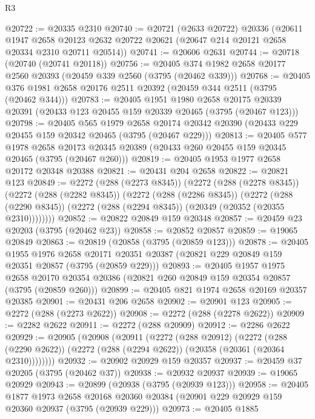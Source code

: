 \begin{lexlean}{R3}
\begin{coremodule}
@20722 := @20335 @2310
@20740 := @20721
    (@2633 @20722)
    @20336
    (@20611
      @1947
      @2658
      @20123
      @2632
      @20722
      @20621
      (@20647 @214 @20121 @2658 @20334 @2310 @20711 @20514))
@20741 := @20606 @2631
@20744 := @20718 (@20740 (@20741 @20118))
@20756 := @20405 @374 @1982 @2658 @20177 @2560 @20393 (@20459 @339 @2560 (@3795 (@20462 @339)))
@20768 := @20405 @376 @1981 @2658 @20176 @2511 @20392 (@20459 @344 @2511 (@3795 (@20462 @344)))
@20783 := @20405
    @1951
    @1980
    @2658
    @20175
    @20339
    @20391
    (@20433 @123 @20455 @159 @20339 @20465 (@3795 (@20467 @123)))
@20798 := @20405
    @565
    @1979
    @2658
    @20174
    @20342
    @20390
    (@20433 @229 @20455 @159 @20342 @20465 (@3795 (@20467 @229)))
@20813 := @20405
    @577
    @1978
    @2658
    @20173
    @20345
    @20389
    (@20433 @260 @20455 @159 @20345 @20465 (@3795 (@20467 @260)))
@20819 := @20405 @1953 @1977 @2658 @20172 @20348 @20388
@20821 := @20431 @204 @2658
@20822 := @20821 @123
@20849 := @2272
    (@288 (@2273 @8345))
    (@2272
      (@288 (@2278 @8345))
      (@2272
        (@288 (@2282 @8345))
        (@2272
          (@288 (@2286 @8345))
          (@2272
            (@288 (@2290 @8345))
            (@2272 (@288 (@2294 @8345)) (@20349 (@20352 (@20355 @2310))))))))
@20852 := @20822 @20849 @159 @20348
@20857 := @20459 @23 @20203 (@3795 (@20462 @23))
@20858 := @20852 @20857
@20859 := @19065 @20849
@20863 := @20819 (@20858 (@3795 (@20859 @123)))
@20878 := @20405
    @1955
    @1976
    @2658
    @20171
    @20351
    @20387
    (@20821 @229 @20849 @159 @20351 @20857 (@3795 (@20859 @229)))
@20893 := @20405
    @1957
    @1975
    @2658
    @20170
    @20354
    @20386
    (@20821 @260 @20849 @159 @20354 @20857 (@3795 (@20859 @260)))
@20899 := @20405 @821 @1974 @2658 @20169 @20357 @20385
@20901 := @20431 @206 @2658
@20902 := @20901 @123
@20905 := @2272 (@288 (@2273 @2622))
@20908 := @2272 (@288 (@2278 @2622))
@20909 := @2282 @2622
@20911 := @2272 (@288 @20909)
@20912 := @2286 @2622
@20929 := @20905
    (@20908
      (@20911
        (@2272
          (@288 @20912)
          (@2272
            (@288 (@2290 @2622))
            (@2272 (@288 (@2294 @2622)) (@20358 (@20361 (@20364 @2310))))))))
@20932 := @20902 @20929 @159 @20357
@20937 := @20459 @37 @20205 (@3795 (@20462 @37))
@20938 := @20932 @20937
@20939 := @19065 @20929
@20943 := @20899 (@20938 (@3795 (@20939 @123)))
@20958 := @20405
    @1877
    @1973
    @2658
    @20168
    @20360
    @20384
    (@20901 @229 @20929 @159 @20360 @20937 (@3795 (@20939 @229)))
@20973 := @20405
    @1885

\end{coremodule}
\end{lexlean}
